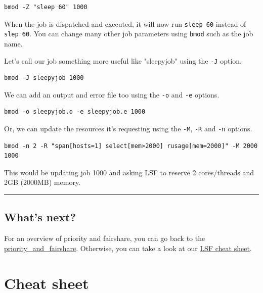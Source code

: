 \documentclass[11pt]{article}
\begin{document}
    \begin{verbatim}
bmod -Z "sleep 60" 1000
\end{verbatim}

    When the job is dispatched and executed, it will now run
\texttt{sleep\ 60} instead of \texttt{slep\ 60}. You can change many
other job parameters using \texttt{bmod} such as the job name.

Let's call our job something more useful like "sleepyjob" using the
\texttt{-J} option.

    \begin{verbatim}
bmod -J sleepyjob 1000
\end{verbatim}

    We can add an output and error file too using the \texttt{-o} and
\texttt{-e} options.

    \begin{verbatim}
bmod -o sleepyjob.o -e sleepyjob.e 1000
\end{verbatim}

    Or, we can update the resources it's requesting using the \texttt{-M},
\texttt{-R} and \texttt{-n} options.

    \begin{verbatim}
bmod -n 2 -R "span[hosts=1] select[mem>2000] rusage[mem=2000]" -M 2000 1000
\end{verbatim}

    This would be updating job 1000 and asking LSF to reserve 2
cores/threads and 2GB (2000MB) memory.

    \begin{center}\rule{0.5\linewidth}{\linethickness}\end{center}

    \subsection{What's next?}\label{whats-next}

For an overview of priority and fairshare, you can go back to the
\href{priority_and_fairshare.ipynb}{priority\_and\_fairshare}.
Otherwise, you can take a look at our \href{cheat_sheet.ipynb}{LSF cheat
sheet}.





\newpage






    \section{Cheat sheet}\label{cheat-sheet}
\end{document}
